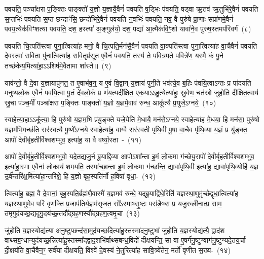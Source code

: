 पवयति॒ पञ्चा᳚क्षरा प॒ङ्क्तिः पाङ्क्तो॑ य॒ज्ञो य॒ज्ञायै॒वैनं॑ पवयति ष॒ड्भिः प॑वयति॒ षड्वा ऋ॒तव॑ ऋ॒तुभि॑रे॒वैनं॑ पवयति स॒प्तभिः॑ पवयति स॒प्त छन्दाꣳ॑सि॒ छन्दो॑भिरे॒वैनं॑ पवयति न॒वभिः॑ पवयति॒ नव॒ वै पुरु॑षे प्रा॒णाः सप्रा॑णमे॒वैनं॑ पव\-य॒त्येक॑विꣳशत्या पवयति॒ दश॒ हस्त्या॑ अ॒ङ्गुल॑यो॒ दश॒ पद्या॑ आ॒त्मैक॑वि॒ꣳ॒शो यावा॑ने॒व पुरु॑ष॒स्तमप॑रिवर्गं~(८)\ip

पवयति चि॒त्पति॑स्त्वा पुना॒त्वित्या॑ह॒ मनो॒ वै चि॒त्पति॒र्मन॑सै॒वैनं॑ पवयति वा॒क्पति॑स्त्वा पुना॒त्वित्या॑ह वा॒चैवैनं॑ पवयति दे॒वस्त्वा॑ सवि॒ता पु॑ना॒त्वित्या॑ह सवि॒तृप्र॑सूत ए॒वैनं॑ पवयति॒ तस्य॑ ते पवित्रपते प॒वित्रे॑ण॒ यस्मै॒ कं पु॒ने तच्छ॑केय॒मित्या॑हा॒\-ऽऽ\-शिष॑मे॒वैतामा शा᳚स्ते॥~(९)\ip

{}

याव॑न्तो॒ वै दे॒वा य॒ज्ञायापु॑नत॒ त ए॒वाभ॑व॒न्॒ य ए॒वं वि॒द्वान् य॒ज्ञाय॑ पुनी॒ते भव॑त्ये॒व ब॒हिः प॑वयि॒त्वा\-ऽन्तः प्र पा॑दयति मनुष्यलो॒क ए॒वैनं॑ पवयि॒त्वा पू॒तं दे॑वलो॒कं प्र ण॑य॒त्यदी᳚क्षित॒ एक॒या\-ऽऽहु॒त्येत्या॑हुः स्रु॒वेण॒ चत॑स्रो जुहोति दीक्षित॒त्वाय॑ स्रु॒चा प॑ञ्च॒मीं पञ्चा᳚क्षरा प॒ङ्क्तिः पाङ्क्तो॑ य॒ज्ञो य॒ज्ञमे॒वाव॑ रुन्ध॒ आकू᳚त्यै प्र॒युजे॒\-ऽग्नये॒~(१०)\ip

स्वाहेत्या॒हा\-ऽऽकू᳚त्या॒ हि पुरु॑षो य॒ज्ञम॒भि प्र॑यु॒ङ्क्ते यजे॒येति॑ मे॒धायै॒ मन॑से॒\-ऽग्नये॒ स्वाहेत्या॑ह मे॒धया॒ हि मन॑सा॒ पुरु॑षो य॒ज्ञम॑भि॒गच्छ॑ति॒ सर॑स्वत्यै पू॒ष्णे᳚\-ऽग्नये॒ स्वाहेत्या॑ह॒ वाग्वै सर॑स्वती पृथि॒वी पू॒षा वा॒चैव पृ॑थि॒व्या य॒ज्ञं प्र यु॑ङ्क्त॒ आपो॑ देवीर्बृहतीर्विश्वशम्भुव॒ इत्या॑ह॒ या वै वर्ष्या॒स्ता~-~(११)\ip

आपो॑ दे॒वीर्बृ॑ह॒तीर्वि॒श्वश॑म्भुवो॒ यदे॒तद्यजु॒र्न ब्रू॒याद्दि॒व्या आपो\-ऽशा᳚न्ता इ॒मं लो॒कमा ग॑च्छेयु॒रापो॑ देवीर्बृहतीर्विश्वशम्भुव॒ इत्या॑हा॒स्मा ए॒वैना॑ लो॒काय॑ शमयति॒ तस्मा᳚च्छा॒न्ता इ॒मं लो॒कमा ग॑च्छन्ति॒ द्यावा॑\-पृथि॒वी इत्या॑ह॒ द्यावा॑पृथि॒व्योर्\mbox{}हि य॒ज्ञ उ॒र्व॑न्तरि॑क्ष॒मित्या॑हा॒न्तरि॑क्षे॒ हि य॒ज्ञो बृह॒स्पति॑र्नो ह॒विषा॑ वृधा॒-~(१२)\ip

त्वित्या॑ह॒ ब्रह्म॒ वै दे॒वानां॒ बृह॒स्पति॒र्ब्रह्म॑णै॒वास्मै॑ य॒ज्ञमव॑ रुन्धे॒ यद्ब्रू॒याद्वि॑धे॒रिति॑ यज्ञस्था॒णुमृ॑च्छेद्वृधा॒त्वित्या॑ह यज्ञस्था॒णुमे॒व परि॑ वृणक्ति प्र॒जा\-प॑तिर्य॒ज्ञम॑सृजत॒ सो᳚\-ऽस्माथ्सृ॒ष्टः परा॑ङै॒थ्स प्र यजु॒रव्ली॑ना॒त्प्र साम॒ तमृगुद॑यच्छ॒द्यदृगु॒दय॑च्छ॒त्तदौ᳚द्ग्रह॒णस्यौ᳚द्ग्रहण॒त्वमृ॒चा~(१३)\ip

जु॑होति य॒ज्ञस्योद्य॑त्या अनु॒ष्टुप्छन्द॑सा॒मुद॑यच्छ॒दित्या॑हु॒स्तस्मा॑दनु॒ष्टुभा॑ जुहोति य॒ज्ञस्योद्य॑त्यै॒ द्वाद॑श वाथ्सब॒न्धान्युद॑यच्छ॒न्नित्या॑हु॒स्तस्मा᳚द्\-द्वाद॒शभि॑र्वाथ्सबन्ध॒विदो॑ दीक्षयन्ति॒ सा वा ए॒षर्ग॑नु॒ष्टुग्वाग॑नु॒ष्टुग्यदे॒तय॒र्चा दी॒क्षय॑ति वा॒चैवैन॒ꣳ॒ सर्व॑या दीक्षयति॒ विश्वे॑ दे॒वस्य॑ ने॒तुरित्या॑ह सावि॒त्र्ये॑तेन॒ मर्तो॑ वृणीत स॒ख्य-~(१४)\ip

